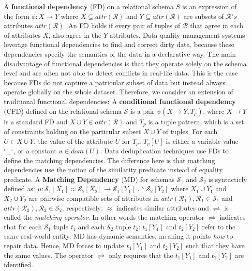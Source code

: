 A \textbf{functional dependency} (FD) on a relational schema $S$ is an expression of the form $\phi: X \rightarrow Y$ where $X \subseteq attr(\mathcal{R}) $ and $Y \subseteq attr(\mathcal{R}) $ are subsets of $\mathcal{R}'s$ attributes $attr(\mathcal{R})$. An FD holds if every pair of tuples of $\mathcal{R}$ that agree in each of attributes $X$, also agree in the $Y$ attributes. Data quality management systems leverage functional dependencies to find and correct dirty data, because these dependencies specify the semantics of the data in a declarative way. The main disadvantage of functional dependencies is that they operate solely on the schema level and are often not able to detect conflicts in real-life data. This is the case because FDs do not capture a patricular subset of data but instead always operate globally on the whole dataset.
Therefore, we consider an extension of traditional functional dependencies:  A \textbf{conditional functional dependency} (CFD) defined on the relational schema $\mathcal{S}$ is a pair $\psi(X \rightarrow Y , T_p)$,  where $X \rightarrow Y$ is a standard FD and $X \cup Y \in attr(\mathcal{R})$ and $T_p$ is a tuple pattern, which is a set of constraints holding on the particular subset $X \cup Y$ of tuples. For each $U \in X \cup Y$, the value of the attribute $U$ for $T_p$, $T_p[U]$ is either a variable value $`\_`$, or a constant $u \in dom(U)$. Data deduplication techniques use FDs to define the matching dependencies. The difference here is that matching dependencies use the notion of the similarity predicate instead of equality predicate. A \textbf{Matching Dependency} (MD) for schemas $\mathcal{S}_1$ and $\mathcal{S}_2$ is syntacticly defined as:
$\mu: \mathcal{S}_1[X_1]\approx \mathcal{S}_2[X_2]\rightarrow \mathcal{S}_1[Y_1]\rightleftharpoons \mathcal{S}_2[Y_2]$ where $X_1 \cup Y_1$ and $X_2 \cup Y_2$ are pairwise compatible sets of attributes in $attr(\mathcal{R}_1), \mathcal{R}_1\in \mathcal{S}_1$ and $attr(\mathcal{R}_2), \mathcal{R}_2\in \mathcal{S}_2$, respectively; $\approx$ indicates similar attributes and $\rightleftharpoons$ is called the \textit{matching operator}. In other words the matching operator $\rightleftharpoons$ indicates that for each $\mathcal{S}_1$ tuple $t_1$ and each $\mathcal{S}_2$ tuple $t_2$: $t_1[Y_1]$ and $t_2[Y_2]$ refer to the same real-world entity. MD has dynamic semantics, meaning it points \textit{how} to repair data. Hence, MD forces to update $t_1[Y_1]$ and $t_2[Y_2]$ such that they have the same values. %
The operator $\rightleftharpoons$ only requires that the $t_1[Y_1]$ and $t_2[Y_2]$ are identified.

